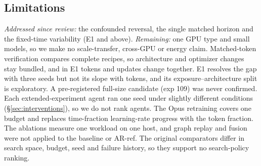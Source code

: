 \documentclass{article}
\newif\ifshowhumanmarkers \showhumanmarkersfalse
\newcommand{\humantag}[1]{{\color{humanframe}\sffamily\scriptsize\bfseries HUMAN AUTHOR MUST REWRITE/VERIFY [#1]}\ }
\newcommand{\humanauthor}[2][]{\ifshowhumanmarkers\begin{humanbox}\humantag{#1}#2\end{humanbox}\else #2\par\fi}
\begin{document}
\subsection{Limitations}
\humanauthor[P2-14 r6]{\emph{Addressed since review:} the confounded reversal, the single matched horizon and the fixed-time variability (E1 and above). \emph{Remaining:} one GPU type and small models, so we make no scale-transfer, cross-GPU or energy claim. Matched-token verification compares complete recipes, so architecture and optimizer changes stay bundled, and in E1 tokens and updates change together. E1 resolves the gap with three seeds but not its slope with tokens, and its exposure--architecture split is exploratory. A pre-registered full-size candidate (exp 109) was never confirmed. Each extended-experiment agent ran one seed under slightly different conditions (\S\ref{sec:interventions}), so we do not rank agents. The Opus retraining covers one budget and replaces time-fraction learning-rate progress with the token fraction. The ablations measure one workload on one host, and graph replay and fusion were not applied to the baseline or AR-ref. The original comparators differ in search space, budget, seed and failure history, so they support no search-policy ranking.}
\end{document}
